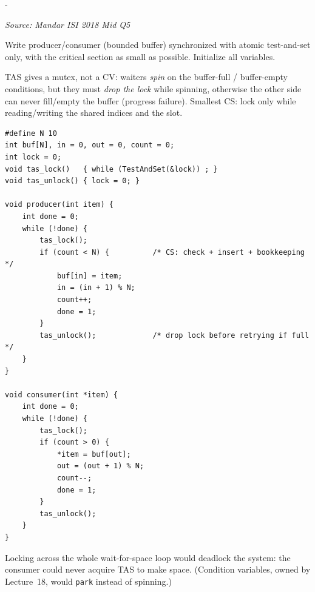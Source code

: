 \documentclass[11pt,a4paper]{article}
\makeatletter
\newcommand{\keepspace}[1]{\par\penalty-100\begingroup
  \setlength{\dimen@}{#1}\dimen@ii\pagegoal\advance\dimen@ii-\pagetotal
  \ifdim\dimen@>\dimen@ii\ifdim\dimen@ii>\z@\vfil\fi\break\fi\endgroup}
\newcounter{qn}[section]
\newenvironment{Qn}[4]{%
  \refstepcounter{qn}\keepspace{7\baselineskip}%
  \begin{tcolorbox}[qboxstyle, title={Q\thesection.\theqn\ \ [#1 \textbar\ #2]\ \ #4}]%
  {\footnotesize\color{g3}\textit{Source: #3}}\par\smallskip%
}{%
  \end{tcolorbox}%
}
\newenvironment{Sol}{%
  \begin{tcolorbox}[sboxstyle, title={Solution}]%
}{%
  \end{tcolorbox}\vspace{0.35em}%
}
\makeatother
\begin{document}
\begin{Qn}{Medium-Hard}{Lect 17}{Mandar ISI 2018 Mid Q5}{Smallest TAS critical section for a bounded buffer}
Write producer/consumer (bounded buffer) synchronized with atomic test-and-set only, with the critical section as small as possible. Initialize all variables.
\end{Qn}
\begin{Sol}
TAS gives a mutex, not a CV: waiters \emph{spin} on the buffer-full / buffer-empty conditions, but they must \emph{drop the lock} while spinning, otherwise the other side can never fill/empty the buffer (progress failure). Smallest CS: lock only while reading/writing the shared indices and the slot.

\begin{lstlisting}[numbers=none]
#define N 10
int buf[N], in = 0, out = 0, count = 0;
int lock = 0;
void tas_lock()   { while (TestAndSet(&lock)) ; }
void tas_unlock() { lock = 0; }

void producer(int item) {
    int done = 0;
    while (!done) {
        tas_lock();
        if (count < N) {          /* CS: check + insert + bookkeeping */
            buf[in] = item;
            in = (in + 1) % N;
            count++;
            done = 1;
        }
        tas_unlock();             /* drop lock before retrying if full */
    }
}

void consumer(int *item) {
    int done = 0;
    while (!done) {
        tas_lock();
        if (count > 0) {
            *item = buf[out];
            out = (out + 1) % N;
            count--;
            done = 1;
        }
        tas_unlock();
    }
}
\end{lstlisting}

Locking across the whole wait-for-space loop would deadlock the system: the consumer could never acquire TAS to make space. (Condition variables, owned by Lecture~18, would \texttt{park} instead of spinning.)
\end{Sol}
\end{document}
